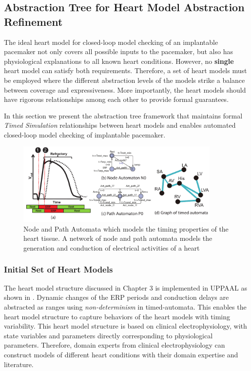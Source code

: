 \subsection{Abstraction Tree for Heart Model Abstraction Refinement}
The ideal heart model for closed-loop model checking of an implantable pacemaker not only covers all possible inputs to the pacemaker, but also has physiological explanations to all known heart conditions.
However, no \textbf{single} heart model can satisfy both requirements.
Therefore, a set of heart models must be employed where the different abstraction levels of the models strike a balance between coverage and expressiveness.
More importantly, the heart models should have rigorous relationships among each other to provide formal guarantees.

In this section we present the abstraction tree framework that maintains formal \emph{Timed Simulation} relationships between heart models and enables automated closed-loop model checking of implantable pacemaker. %
\begin{figure}[!t]
	\centering
	\includegraphics[width=0.9\textwidth]{figs/init_abs.pdf}
	\caption{\small Node and Path Automata which models the timing properties of the heart tissue. A network of node and path automata models the generation and conduction of electrical activities of a heart}
	\label{fig:nodepathTA}
\end{figure}
\subsubsection{Initial Set of Heart Models}
The heart model structure discussed in Chapter 3 is implemented in UPPAAL as shown in .
Dynamic changes of the ERP periods and conduction delays are abstracted as ranges using \emph{non-determinism} in timed-automata.
This enables the heart model structure to capture behaviors of the heart models with timing variability.
This heart model structure is based on clinical electrophysiology, with state variables and parameters directly corresponding to physiological parameters.
Therefore, domain experts from clinical electrophysiology can construct models of different heart conditions with their domain expertise and literature.

